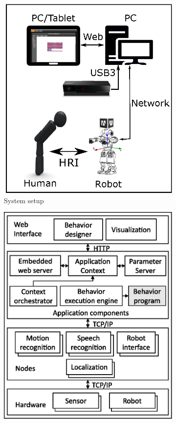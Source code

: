 \begin{figure}
\centering
\begin{subfigure}[t]{0.48\textwidth}
\includegraphics[width=\textwidth]{../thesis/assets/system_setup.eps}
\caption[System setup]{System setup}
\label{fig:system_setup}
\end{subfigure}
\begin{subfigure}[t]{0.44\textwidth}
\includegraphics[width=\textwidth]{../thesis/assets/indriya_architecture.eps}

\end{subfigure}
\end{figure}
